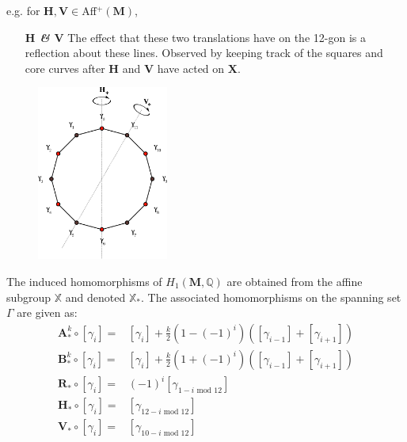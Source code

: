 \documentclass[]{article}
\begin{document}
e.g. for $\mathbf{H,V}\in$Aff$^+(\mathbf{M})$,

\begin{minipage}{0.5\textwidth}
\vspace{0.3in}
\begin{itemize}
\item[\textbf{\emph{$\mathbf{H}$ \& $\mathbf{V}$}}] The effect that these two translations have on the 12-gon is a reflection about these lines. Observed by keeping track of the squares and core curves after $\mathbf{H}$ and $\mathbf{V}$ have acted on $\mathbf{X}$.
\end{itemize}
\end{minipage}
\begin{minipage}{0.7\textwidth}
\begin{figure}[H]
\hspace{0.2in}\includegraphics[width=1.7in]{12gonHV.pdf}
\end{figure}
\end{minipage}

\begin{Def}
The induced homomorphisms of $H_1(\mathbf{M},\mathbb{Q})$ are obtained from the affine subgroup $\mathbb{X}$ and denoted $\mathbb{X}_*$. The associated homomorphisms on the spanning set $\Gamma$ are given as:
\begin{align*}
\mathbf{A}^k_*\circ[\gamma_i]=&[\gamma_i] + \frac{k}{2}(1-(-1)^i)([\gamma_{i-1}]+[\gamma_{i+1}])\\
\mathbf{B}^k_*\circ[\gamma_i]=&[\gamma_i] + \frac{k}{2}(1+(-1)^i)([\gamma_{i-1}]+[\gamma_{i+1}])\\
\mathbf{R}_*\circ[\gamma_i]=&(-1)^i[\gamma_{1-i\text{ mod }12}]\\
\mathbf{H}_*\circ[\gamma_i]=&[\gamma_{12-i\text{ mod }12}]\\
\mathbf{V}_*\circ[\gamma_i]=&[\gamma_{10-i\text{ mod }12}]
\end{align*}
\end{Def}
\end{document}
